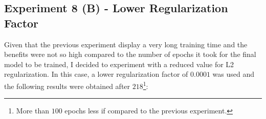 \documentclass[11pt,a4paper]{article}
\begin{document}
\subsection{Experiment 8 (B) - Lower Regularization Factor}
Given that the previous experiment display a very long training time and the benefits were not so high compared to the number of epochs it took for the final model to be trained, I decided to experiment with a reduced value for L2 regularization. In this case, a lower regularization factor of $0.0001$ was used and the following results were obtained after $218$\footnote{More than $100$ epochs less if compared to the previous experiment.}:
\begin{figure}[H]
    \centering
    \qquad

\end{figure}
\end{document}
